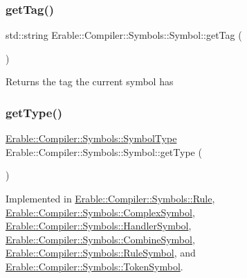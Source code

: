 \mbox{\label{class_erable_1_1_compiler_1_1_symbols_1_1_symbol_a135ecb3f3ede9d5c5804419da61716b5}} 
\subsubsection{\texorpdfstring{getTag()}{getTag()}}
{\footnotesize\ttfamily std\+::string Erable\+::\+Compiler\+::\+Symbols\+::\+Symbol\+::get\+Tag (\begin{DoxyParamCaption}{ }\end{DoxyParamCaption})\hspace{0.3cm}{\ttfamily [virtual]}}

\begin{DoxyReturn}{Returns}
the tag the current symbol has 
\end{DoxyReturn}
\mbox{\label{class_erable_1_1_compiler_1_1_symbols_1_1_symbol_a781d595ec8d14efcdbbf6d6123af1f50}} 
\subsubsection{\texorpdfstring{getType()}{getType()}\hspace{0.1cm}{\footnotesize\ttfamily [1/2]}}
{\footnotesize\ttfamily \mbox{\hyperlink{namespace_erable_1_1_compiler_1_1_symbols_a3b60ec10cda0920ec4368128361b8320}{Erable\+::\+Compiler\+::\+Symbols\+::\+Symbol\+Type}} Erable\+::\+Compiler\+::\+Symbols\+::\+Symbol\+::get\+Type (\begin{DoxyParamCaption}{ }\end{DoxyParamCaption})\hspace{0.3cm}{\ttfamily [pure virtual]}}



Implemented in \mbox{\hyperlink{class_erable_1_1_compiler_1_1_symbols_1_1_rule_a6e0b51b5ecaed4785480d534dc09cb8e}{Erable\+::\+Compiler\+::\+Symbols\+::\+Rule}}, \mbox{\hyperlink{class_erable_1_1_compiler_1_1_symbols_1_1_complex_symbol_a868025e3a718e2ae6226a89403859b3a}{Erable\+::\+Compiler\+::\+Symbols\+::\+Complex\+Symbol}}, \mbox{\hyperlink{class_erable_1_1_compiler_1_1_symbols_1_1_handler_symbol_a70340ea487e496cced8c05aa45968b56}{Erable\+::\+Compiler\+::\+Symbols\+::\+Handler\+Symbol}}, \mbox{\hyperlink{struct_erable_1_1_compiler_1_1_symbols_1_1_combine_symbol_a416d89f88e2708deeaee33425849ae4a}{Erable\+::\+Compiler\+::\+Symbols\+::\+Combine\+Symbol}}, \mbox{\hyperlink{class_erable_1_1_compiler_1_1_symbols_1_1_rule_symbol_a83de7b4d8a52eb6da9298fb19f020d49}{Erable\+::\+Compiler\+::\+Symbols\+::\+Rule\+Symbol}}, and \mbox{\hyperlink{class_erable_1_1_compiler_1_1_symbols_1_1_token_symbol_ab80bcf5e531cee5fbb5fe798449e4cbb}{Erable\+::\+Compiler\+::\+Symbols\+::\+Token\+Symbol}}.

